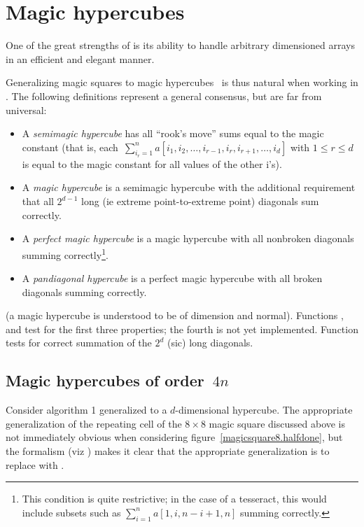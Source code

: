 \documentclass[nojss]{jss}
\begin{document}
\section{Magic hypercubes}

One of the great strengths of  is its ability to handle arbitrary
dimensioned arrays in an efficient and elegant manner.

Generalizing magic squares to magic hypercubes~\citep{hendricks1973} is
thus natural when working in .  The following definitions represent
a general consensus, but are far from universal:

\begin{itemize}
\item A {\em semimagic hypercube} has all ``rook's move'' sums equal
to the magic constant (that is, each~$\sum_{i_r=1}^n
a[i_1,i_2,\ldots,i_{r-1},i_r,i_{r+1},\ldots,i_d]$ with $1\leqslant
r\leqslant d$ is equal to the magic constant for all values of the
other i's).
\item A {\em magic hypercube} is a semimagic hypercube with the
 additional requirement that all $2^{d-1}$ long (ie extreme
 point-to-extreme point) diagonals sum correctly.
\item A {\em perfect magic hypercube} is a magic
hypercube with all nonbroken diagonals summing correctly\footnote{This
  condition is quite restrictive; in the case
of a tesseract, this would include subsets such
as $\sum_{i=1}^na[1,i,n-i+1,n]$ summing correctly.}.
\item A {\em pandiagonal hypercube} is a perfect magic hypercube with
all broken diagonals summing correctly.
\end{itemize}
(a magic hypercube is understood to be of dimension 
and normal).  Functions ,
 and  test for the first
three properties; the fourth is not yet implemented.  Function
 tests for correct summation of the
$2^d$ (sic) long diagonals.

\subsection[Magic hypercubes of order 4n]{Magic hypercubes of
  order~{\boldmath $4n$}}

Consider algorithm 1 generalized to a $d$-dimensional hypercube.  The
appropriate generalization of the repeating cell of the $8\times 8$
magic square discussed above is not immediately obvious when
considering figure~\ref{magicsquare8.halfdone}, but the  formalism
(viz ) makes it clear that
the appropriate generalization is to replace  with
.
\end{document}
